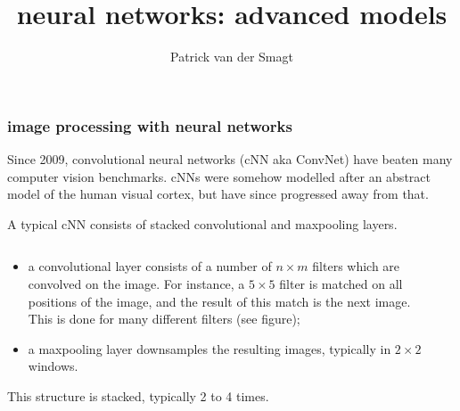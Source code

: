 \documentclass[USenglish,pdftex,compress,10pt,svgnamesi,handout]{beamer}
\title{neural networks: advanced models}
\author{Patrick van der Smagt}
\date{}
\begin{document}
\begin{frame}
	\titlepage
	
	\vfil
\end{frame}



\begin{frame}
\frametitle{image processing with neural networks}

Since 2009, convolutional neural networks (cNN aka ConvNet) have  beaten many computer vision benchmarks.
cNNs were somehow modelled after an abstract model of the human visual cortex, but have since progressed away from that.

A typical cNN consists of stacked convolutional and maxpooling layers.
\begin{columns}
\begin{column}{0.7\textwidth}
\begin{itemize}
\item a convolutional layer consists of a number of $n\times m$ filters which are convolved on the image. For instance, a $5\times5$ filter is matched on all positions of the image, and the result of this match is the next image.  This is done for many different filters (see figure);
\item a maxpooling layer downsamples the resulting images, typically in $2\times2$ windows.
\end{itemize}
This structure is stacked, typically 2 to 4 times.
\end{column}
\begin{column}{0.25\textwidth}

\end{column}
\end{columns}
\end{frame}
\end{document}
